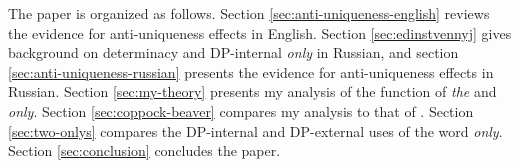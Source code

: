 The paper is organized as follows. Section \ref{sec:anti-uniqueness-english} reviews the evidence for anti-uniqueness effects in English. Section \ref{sec:edinstvennyj} gives background on determinacy and DP-internal \textit{only} in Russian, and section \ref{sec:anti-uniqueness-russian} presents the evidence for anti-uniqueness effects in Russian. Section \ref{sec:my-theory} presents my analysis of the function of \textit{the} and \textit{only}. Section \ref{sec:coppock-beaver} compares my analysis to that of \citet{cb2015}. Section \ref{sec:two-onlys} compares the DP-internal and DP-external uses of the word \textit{only}. Section \ref{sec:conclusion} concludes the paper.